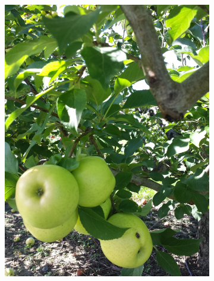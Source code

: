 \begin{figure}[htb]
\begin{subfigure}[t]{0.3\textwidth}
    \includegraphics[width=\textwidth]{figures/active_counting/appleview2.jpg}
\end{subfigure}\quad \begin{subfigure}[t]{0.3\textwidth}

\end{subfigure}
\end{figure}

